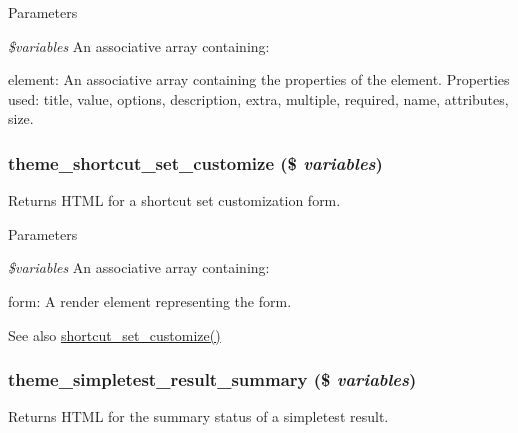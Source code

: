 \begin{DoxyParams}{Parameters}
\item[{\em \$variables}]An associative array containing:
\begin{DoxyItemize}
\item element: An associative array containing the properties of the element. Properties used: title, value, options, description, extra, multiple, required, name, attributes, size. 
\end{DoxyItemize}\end{DoxyParams}
\hypertarget{group__themeable_ga09ee7cf1498bdf9d44c787179a9c24c8}{
\subsubsection[{theme\_\-shortcut\_\-set\_\-customize}]{\setlength{\rightskip}{0pt plus 5cm}theme\_\-shortcut\_\-set\_\-customize (\$ {\em variables})}}
\label{group__themeable_ga09ee7cf1498bdf9d44c787179a9c24c8}
Returns HTML for a shortcut set customization form.


\begin{DoxyParams}{Parameters}
\item[{\em \$variables}]An associative array containing:
\begin{DoxyItemize}
\item form: A render element representing the form.
\end{DoxyItemize}\end{DoxyParams}
\begin{DoxySeeAlso}{See also}
\hyperlink{group__forms_ga6d25a8f35b26a475dc005c2cad4d902c}{shortcut\_\-set\_\-customize()} 
\end{DoxySeeAlso}
\hypertarget{group__themeable_ga2d5ee334c73f279fb02e602ae8bf5edc}{
\subsubsection[{theme\_\-simpletest\_\-result\_\-summary}]{\setlength{\rightskip}{0pt plus 5cm}theme\_\-simpletest\_\-result\_\-summary (\$ {\em variables})}}
\label{group__themeable_ga2d5ee334c73f279fb02e602ae8bf5edc}
Returns HTML for the summary status of a simpletest result.


